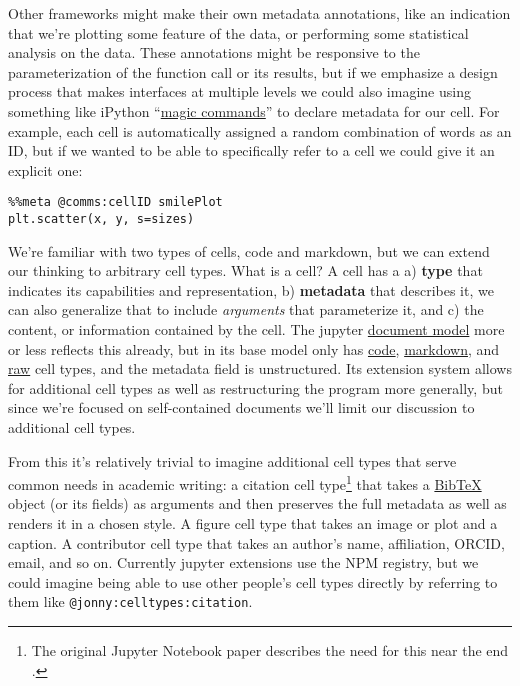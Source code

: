 Other frameworks might make their own metadata annotations, like an
indication that we're plotting some feature of the data, or performing
some statistical analysis on the data. These annotations might be
responsive to the parameterization of the function call or its results,
but if we emphasize a design process that makes interfaces at multiple
levels we could also imagine using something like iPython
``\href{https://ipython.readthedocs.io/en/stable/interactive/magics.html}{magic
commands}'' to declare metadata for our cell. For example, each cell is
automatically assigned a random combination of words as an ID, but if we
wanted to be able to specifically refer to a cell we could give it an
explicit one:

\begin{verbatim}
%%meta @comms:cellID smilePlot
plt.scatter(x, y, s=sizes)
\end{verbatim}

We're familiar with two types of cells, code and markdown, but we can
extend our thinking to arbitrary cell types. What is a cell? A cell has
a a) \textbf{type} that indicates its capabilities and representation,
b) \textbf{metadata} that describes it, we can also generalize that to
include \emph{arguments} that parameterize it, and c) the content, or
information contained by the cell. The jupyter
\href{https://jupyterlab.readthedocs.io/en/stable/api/classes/cells.cellmodel-1.html}{document
model} more or less reflects this already, but in its base model only
has
\href{https://jupyterlab.readthedocs.io/en/stable/api/classes/cells.codecellmodel-1.html}{code},
\href{https://jupyterlab.readthedocs.io/en/stable/api/classes/cells.markdowncellmodel.html}{markdown},
and
\href{https://jupyterlab.readthedocs.io/en/stable/api/classes/cells.rawcellmodel.html}{raw}
cell types, and the metadata field is unstructured. Its extension system
allows for additional cell types as well as restructuring the program
more generally, but since we're focused on self-contained documents
we'll limit our discussion to additional cell types.

From this it's relatively trivial to imagine additional cell types that
serve common needs in academic writing: a citation cell type\footnote{The
  original Jupyter Notebook paper describes the need for this near the
  end \citep{kluyverJupyterNotebooksPublishing2016} .} that takes
a \href{http://www.bibtex.org/Format/}{BibTeX} object (or its fields) as
arguments and then preserves the full metadata as well as renders it in
a chosen style. A figure cell type that takes an image or plot and a
caption. A contributor cell type that takes an author's name,
affiliation, ORCID, email, and so on. Currently jupyter extensions use
the NPM registry, but we could imagine being able to use other people's
cell types directly by referring to them like
\texttt{@jonny:celltypes:citation}.

